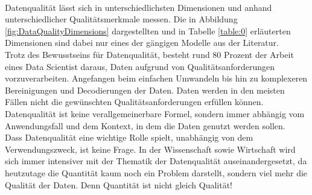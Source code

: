 \begin{onehalfspace}
\begin{table}[h]
            \caption{Data Quality Dimensions Merkmale}
            \label{table:0}
        \end{table}
        \\
        Datenqualität lässt sich in unterschiedlichsten Dimensionen und anhand unterschiedlicher Qualitätsmerkmale messen. Die in Abbildung \ref*{fig:DataQualityDimensions} dargestellten und in Tabelle \ref*{table:0} erläuterten Dimensionen sind dabei nur eines der gängigen Modelle aus der Literatur. 
        \\
        Trotz des Bewusstseins für Datenqualität, besteht rund 80 Prozent der Arbeit eines Data Scientist daraus, Daten aufgrund von Qualitätsanforderungen vorzuverarbeiten.\cite{Horn2022} Angefangen beim einfachen Umwandeln bis hin zu komplexeren Bereinigungen und Decodierungen der Daten. Daten werden in den meisten Fällen nicht die gewünschten Qualitätsanforderungen erfüllen können. Datenqualität ist keine verallgemeinerbare Formel, sondern immer abhängig vom Anwendungsfall und dem Kontext, in dem die Daten genutzt werden sollen.
        \\
        Dass Datenqualität eine wichtige Rolle spielt, unabhängig von dem Verwendungszweck, ist keine Frage. In der Wissenschaft sowie Wirtschaft wird sich immer intensiver mit der Thematik der Datenqualität auseinandergesetzt, da heutzutage die Quantität kaum noch ein Problem darstellt, sondern viel mehr die Qualität der Daten.\cite{Lis2019} Denn Quantität ist nicht gleich Qualität!



\end{onehalfspace}
